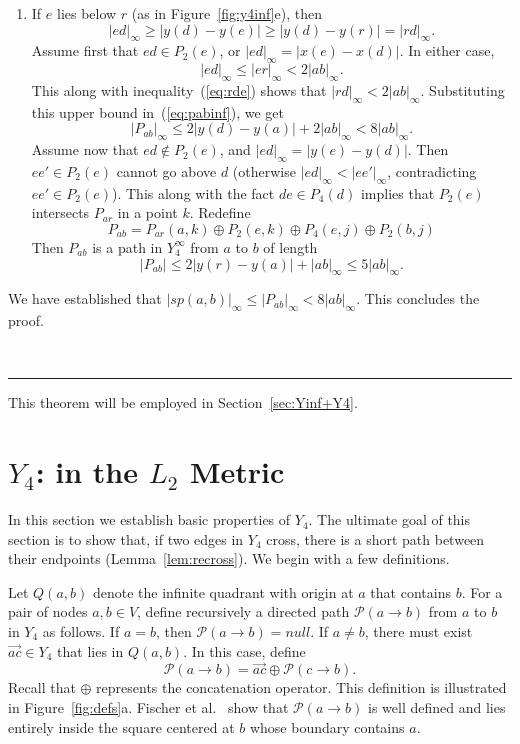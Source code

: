 \pdfoutput=1  \documentclass[11pt]{article}
\newcommand{\qed}{\rule{0.5em}{1.5ex}}
\newcommand{\fqed}{{\hfill~\qed}}
\newenvironment{proof}{{\noindent \bf Proof.}}
                      {{\hfill \fqed} \vspace{1em}}
\newcommand{\Pa}{{\mathcal P}}
\begin{document}
\begin{proof}
\begin{enumerate}
\item
If $e$ lies below $r$ (as in Figure~\ref{fig:y4inf}e), then
\begin{equation}
|ed|_\infty \ge |y(d)-y(e)| \ge |y(d)-y(r)| = |rd|_\infty.
\label{eq:rde}
\end{equation}
Assume first that $ed \in P_2(e)$, or $|ed|_\infty = |x(e)-x(d)|$. In either case,
\[
  |ed|_\infty \le |er|_\infty < 2|ab|_\infty.
\]
This along with inequality~(\ref{eq:rde}) shows that $|rd|_\infty < 2|ab|_\infty$.
Substituting this upper bound in~(\ref{eq:pabinf}), we get
\[
|P_{ab}|_\infty \le 2 |y(d)-y(a)| + 2|ab|_\infty < 8|ab|_\infty.
\]
Assume now that $ed \not\in P_2(e)$, and $|ed|_\infty = |y(e)-y(d)|$. Then
$ee' \in P_2(e)$ cannot go above $d$ (otherwise $|ed|_\infty < |ee'|_\infty$,
contradicting $ee' \in P_2(e)$). This along with the fact $de \in P_4(d)$ implies
that $P_2(e)$ intersects $P_{ar}$ in a point $k$. Redefine
\[
P_{ab} = P_{ar}(a,k) \oplus P_2(e, k) \oplus P_4(e, j) \oplus P_2(b,j)
\]
Then $P_{ab}$ is a path in $Y_4^\infty$ from $a$ to $b$ of length
\[
|P_{ab}| \le 2 |y(r)-y(a)| + |ab|_\infty \le 5|ab|_\infty.
\]

\end{enumerate}
We have established that $|sp(a,b)|_\infty \le |P_{ab}|_\infty <  8|ab|_\infty$.
This concludes the proof.
\end{proof}

\noindent
This theorem will be employed in Section~\ref{sec:Yinf+Y4}.

\section{$Y_4$: in the $L_2$ Metric}
\label{secY4L2}
In this section we establish basic properties of $Y_4$. The ultimate goal of this section is
to show that, if two edges in $Y_4$ cross, there is a short path between their endpoints (Lemma~\ref{lem:recross}). We
begin with a few definitions.

Let $Q(a,b)$ denote the infinite quadrant with origin at $a$ that contains $b$.
For a pair of nodes $a, b \in V$, define recursively a directed path
$\Pa(a \rightarrow b)$ from $a$ to $b$ in $Y_4$ as follows.
If $a=b$, then $\Pa(a \rightarrow b) = null$.
If $a \neq b$, there must exist $\overrightarrow{ac} \in Y_4$ that
lies in $Q(a,b)$. In this case, define
\[ \Pa(a \rightarrow b) =
   \overrightarrow{ac} \oplus \Pa(c \rightarrow b).
\]
Recall that $\oplus$ represents the concatenation operator.
This definition is illustrated in Figure~\ref{fig:defs}a.
Fischer et al.~\cite{FLZ98} show that $\Pa(a \rightarrow b)$ is well defined and
lies entirely inside the square centered at $b$ whose boundary contains $a$.
\end{document}
